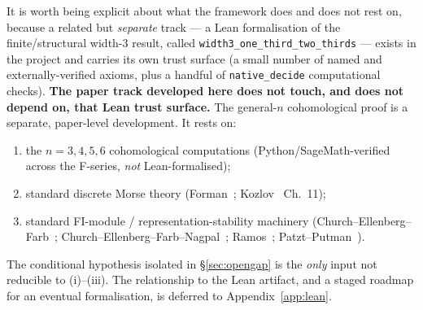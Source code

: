 \documentclass[11pt,reqno]{amsart}
\theoremstyle{plain}
\theoremstyle{definition}
\begin{document}
It is worth being explicit about what the framework does and does not
rest on, because a related but \emph{separate} track --- a Lean
formalisation of the finite/structural width-3 result, called
\texttt{width3\_one\_third\_two\_thirds} --- exists in the project and
carries its own trust surface (a small number of named and
externally-verified axioms, plus a handful of \texttt{native\_decide}
computational checks). \textbf{The paper track developed here does not
touch, and does not depend on, that Lean trust surface.} The general-$n$
cohomological proof is a separate, paper-level development. It rests on:
\begin{enumerate}[leftmargin=2em,label=(\roman*)]
  \item the $n=3,4,5,6$ cohomological computations
        (Python/SageMath-verified across the F-series, \emph{not}
        Lean-formalised);
  \item standard discrete Morse theory
        (Forman~\cite{Forman1998}; Kozlov~\cite{Kozlov2008} Ch.~11);
  \item standard FI-module / representation-stability machinery
        (Church--Ellenberg--Farb~\cite{CEF2015};
        Church--Ellenberg--Farb--Nagpal~\cite{CEFN2014};
        Ramos~\cite{Ramos2017}; Patzt--Putman~\cite{Putman2015,Patzt2017}).
\end{enumerate}
The conditional hypothesis isolated in \S\ref{sec:opengap} is the
\emph{only} input not reducible to (i)--(iii). The relationship to the
Lean artifact, and a staged roadmap for an eventual formalisation, is
deferred to Appendix~\ref{app:lean}.
\end{document}
